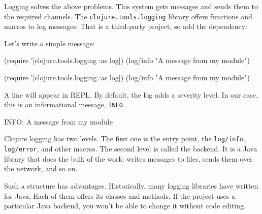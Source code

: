 Logging solves the above problems. This system gets messages and sends them to the required channels. The \verb|clojure.tools.logging| library offers functions and macros to log messages. That is a third-party project, so add the dependency:


\begin{english}
  \begin{clojure}
  \end{clojure}
\end{english}

\noindent
Let's write a simple message:

\ifx\DEVICETYPE\MOBILE

\begin{english}
  \begin{clojure}
(require
  '[clojure.tools.logging :as log])
(log/info "A message from my module")
  \end{clojure}
\end{english}

\else

\begin{english}
  \begin{clojure}
(require '[clojure.tools.logging :as log])
(log/info "A message from my module")
  \end{clojure}
\end{english}

\fi

\noindent
A line will appear in REPL. By default, the log adds a severity level. In our case, this is an informational message, \verb|INFO|.

\begin{english}
  \begin{text}
INFO: A message from my module
  \end{text}
\end{english}

Clojure logging has two levels. The first one is the entry point, the \verb|log/info|, \verb|log/error|, and other macros. The second level is called the backend. It is a Java library that does the bulk of the work: writes messages to files, sends them over the network, and so on.

Such a structure has advantages. Historically, many logging libraries have written for Java. Each of them offers its classes and methods. If the project uses a particular Java backend, you won't be able to change it without code editing.


